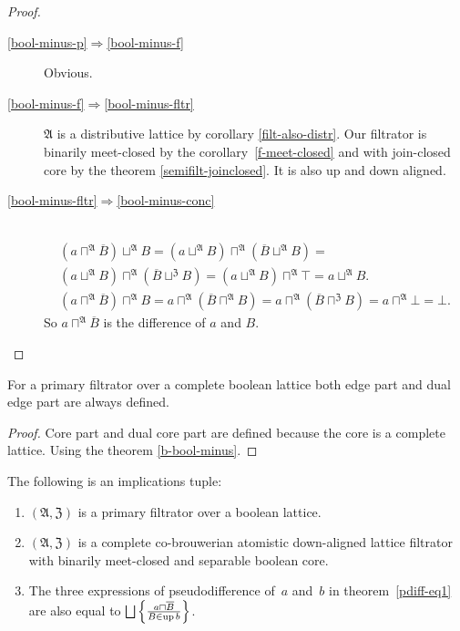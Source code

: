 \begin{proof}
~
\begin{description}
\item [{\ref{bool-minus-p}$\Rightarrow$\ref{bool-minus-f}}] Obvious.
\item [{\ref{bool-minus-f}$\Rightarrow$\ref{bool-minus-fltr}}] $\mathfrak{A}$
is a distributive lattice by corollary \ref{filt-also-distr}. Our
filtrator is binarily meet-closed by the corollary~\ref{f-meet-closed}
and with join-closed core by the theorem \ref{semifilt-joinclosed}.
It is also up and down aligned.
\item [{\ref{bool-minus-fltr}$\Rightarrow$\ref{bool-minus-conc}}] ~
\begin{gather*}
(a\sqcap^{\mathfrak{A}}\overline{B})\sqcup^{\mathfrak{A}}B=(a\sqcup^{\mathfrak{A}}B)\sqcap^{\mathfrak{A}}(\overline{B}\sqcup^{\mathfrak{A}}B)=\\(a\sqcup^{\mathfrak{A}}B)\sqcap^{\mathfrak{A}}(\overline{B}\sqcup^{\mathfrak{Z}}B)=(a\sqcup^{\mathfrak{A}}B)\sqcap^{\mathfrak{A}}\top=a\sqcup^{\mathfrak{A}}B.\\
(a\sqcap^{\mathfrak{A}}\overline{B})\sqcap^{\mathfrak{A}}B=a\sqcap^{\mathfrak{A}}(\overline{B}\sqcap^{\mathfrak{A}}B)=a\sqcap^{\mathfrak{A}}(\overline{B}\sqcap^{\mathfrak{Z}}B)=a\sqcap^{\mathfrak{A}}\bot=\bot.
\end{gather*}
So $a\sqcap^{\mathfrak{A}}\overline{B}$ is the difference of $a$
and $B$.
\end{description}
\end{proof}

\begin{prop}
For a primary filtrator over a complete boolean lattice both edge
part and dual edge part are always defined.\end{prop}
\begin{proof}
Core part and dual core part are defined because the core is a complete
lattice. Using the theorem \ref{b-bool-minus}.\end{proof}

\begin{thm}
The following is an implications tuple:
\begin{enumerate}
\item\label{filt-pseud-filt} $(\mathfrak{A}, \mathfrak{Z})$ is a primary filtrator over a boolean lattice.
\item\label{filt-pseud-fltr} $(\mathfrak{A}, \mathfrak{Z})$ is a complete co-brouwerian atomistic
  down-aligned lattice filtrator with binarily meet-closed and separable boolean core.
\item\label{filt-pseud-res} The three expressions of pseudodifference of~$a$ and~$b$ in theorem~\ref{pdiff-eq1} are also equal to
  $\bigsqcup \setcond{ a \sqcap \overline{B} }{ B \in \up b }$.
\end{enumerate}

\end{thm}

